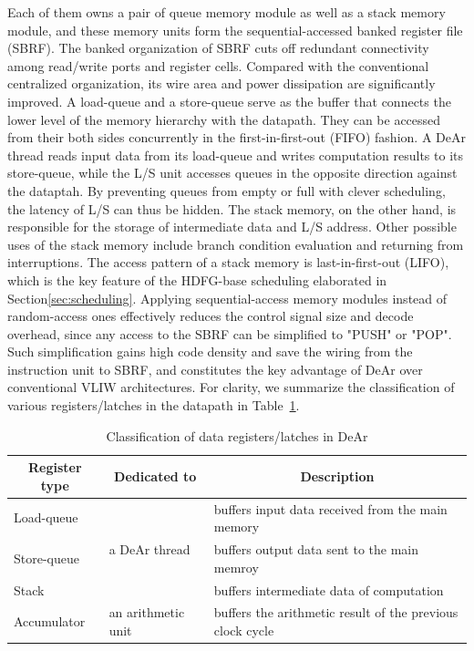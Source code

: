 Each of them owns a pair of queue memory module as well as a stack memory module, 
and these memory units form the sequential-accessed banked register file (SBRF).
The banked organization of SBRF cuts off redundant connectivity among read/write ports and register cells.
Compared with the conventional centralized organization, 
its wire area and power dissipation are significantly improved.
A load-queue and a store-queue serve as the buffer that connects the lower level of the memory hierarchy with the datapath.
They can be accessed from their both sides concurrently in the first-in-first-out (FIFO) fashion.
A DeAr thread reads input data from its load-queue and writes computation results to its store-queue, 
while the L/S unit accesses queues in the opposite direction against the dataptah.
By preventing queues from empty or full with clever scheduling, the latency of L/S can thus be hidden.
The stack memory, on the other hand, is responsible for the storage of intermediate data and L/S address.
Other possible uses of the stack memory include branch condition evaluation and returning from interruptions.
The access pattern of a stack memory is last-in-first-out (LIFO), 
which is the key feature of the HDFG-base scheduling elaborated in Section\ref{sec:scheduling}.
Applying sequential-access memory modules instead of random-access ones effectively reduces the control signal size and decode overhead, 
since any access to the SBRF can be simplified to "PUSH" or "POP".
Such simplification gains high code density and save the wiring from the instruction unit to SBRF, 
and constitutes the key advantage of DeAr over conventional VLIW architectures.
For clarity, we summarize the classification of various registers/latches in the datapath in Table~\ref{tab:register}.
\begin{table}[!ht]
    \caption{Classification of data registers/latches in DeAr}
    \label{tab:register}
    \centering
    \begin{tabular}{|l|l|l|}
        \hline
        \multicolumn{1}{|c|}{\textbf{Register type}} & \multicolumn{1}{c|}{\textbf{Dedicated to}} & \multicolumn{1}{c|}{\textbf{Description}}                 \\ \hline
        Load-queue                                   & \multirow{3}{*}{a DeAr thread}             & buffers input data received from the main memory          \\ \cline{1-1} \cline{3-3} 
        Store-queue                                  &                                            & buffers output data sent to the main memroy               \\ \cline{1-1} \cline{3-3} 
        Stack                                        &                                            & buffers intermediate data of computation                  \\ \hline
        Accumulator                                  & an arithmetic unit                         & buffers the arithmetic result of the previous clock cycle \\ \hline
    \end{tabular}
\end{table}
